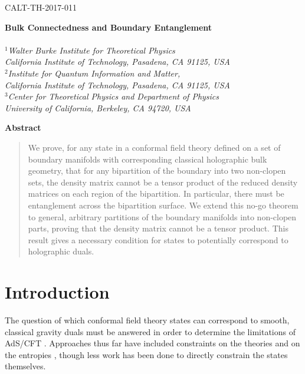 \documentclass[12pt,english]{article}
\begin{document}
\baselineskip=18pt

\hfill CALT-TH-2017-011
\hfill

\vspace{2cm}
\thispagestyle{empty}
\begin{center}
{\LARGE \bf
Bulk Connectedness and Boundary Entanglement
}\\
\bigskip{} \\[7mm]
{\it
$^1$Walter Burke Institute for Theoretical Physics \\[-1mm] California Institute of Technology, Pasadena, CA 91125, USA \\
$^2$Institute for Quantum Information and Matter,\\[-1mm] California Institute of Technology, Pasadena, CA 91125, USA \\
$^3$Center for Theoretical Physics and Department of Physics\\[-1mm]
    University of California, Berkeley, CA 94720, USA}
 \end{center}
\bigskip
\centerline{\large\bf Abstract}


\begin{quote} \small
We prove, for any state in a conformal field theory defined on a set of boundary manifolds with corresponding classical holographic bulk geometry, that for any bipartition of the boundary into two non-clopen sets, the density matrix cannot be a tensor product of the reduced density matrices on each region of the bipartition. 
In particular, there must be entanglement across the bipartition surface. We extend this no-go theorem to general, arbitrary partitions of the boundary manifolds into non-clopen parts, proving that the density matrix cannot be a tensor product. This result gives a necessary condition for states to potentially correspond to holographic duals. 
\end{quote}


\newpage
\tableofcontents

\newpage

\section{Introduction}
The question of which conformal field theory states can correspond to smooth, classical gravity duals must be answered in order to determine the limitations of AdS/CFT \cite{Maldacena:1997re, Witten:1998qj, Aharony:1999ti}. Approaches thus far have included constraints on the theories \cite{Heemskerk:2009pn} and on the entropies \cite{Hayden:2011ag, Bao:2015bfa}, though less work has been done to directly constrain the states themselves.
\end{document}
